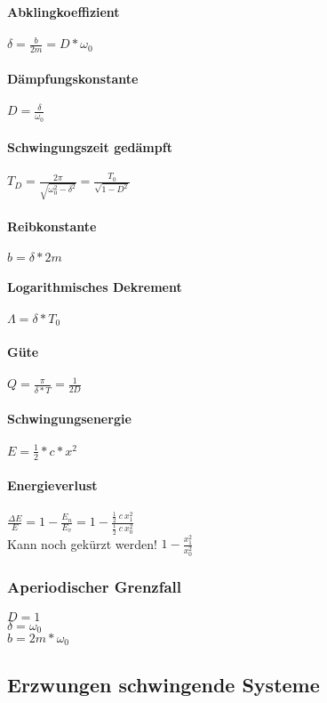 \documentclass[a4paper, 12pt]{scrreprt}
\begin{document}
\paragraph{Abklingkoeffizient} \dotfill \(\delta=\frac{b}{2m}=D*\omega_0\)
\paragraph{Dämpfungskonstante} \dotfill \(D=\frac{\delta}{\omega_0}\)
\paragraph{Schwingungszeit gedämpft} \dotfill \(T_D=\frac{2\pi}{\sqrt{\omega_0^2-\delta^2}}=\frac{T_0}{\sqrt{1-D^2}}\)
\paragraph{Reibkonstante} \dotfill \(b=\delta * 2m\)
\paragraph{Logarithmisches Dekrement} \dotfill \(\Lambda=\delta*T_0\)
\paragraph{Güte} \dotfill \(Q=\frac{\pi}{\delta*T}=\frac{1}{2D}\)
\paragraph{Schwingungsenergie} \dotfill \(E = \frac{1}{2}*c*x^2\)
\paragraph{Energieverlust} \dotfill
\(\frac{\Delta E}{E} = 1-\frac{E_n}{E_v}=1-\frac{\frac{1}{2}\ c\ x_1^2}{\frac{1}{2}\ c\ x_0^2}\)\\
\-\hspace{1.5cm}Kann noch gekürzt werden! \dotfill \(1-\frac{x_1^2}{x_0^2}\)

\subsubsection{Aperiodischer Grenzfall}
\(D=1\)\\
\(\delta=\omega_0\)\\
\(b=2m*\omega_0\)


\subsection{Erzwungen schwingende Systeme}
\end{document}
